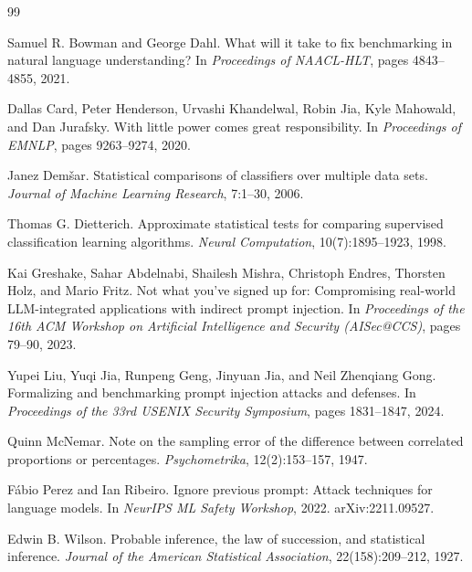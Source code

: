 \documentclass[11pt]{article}
\begin{document}
\begin{thebibliography}{99}

Samuel R. Bowman and George Dahl.
\newblock What will it take to fix benchmarking in natural language understanding?
\newblock In \emph{Proceedings of NAACL-HLT}, pages 4843--4855, 2021.

Dallas Card, Peter Henderson, Urvashi Khandelwal, Robin Jia, Kyle Mahowald, and
Dan Jurafsky.
\newblock With little power comes great responsibility.
\newblock In \emph{Proceedings of EMNLP}, pages 9263--9274, 2020.

Janez Dem\v{s}ar.
\newblock Statistical comparisons of classifiers over multiple data sets.
\newblock \emph{Journal of Machine Learning Research}, 7:1--30, 2006.

Thomas G. Dietterich.
\newblock Approximate statistical tests for comparing supervised classification
learning algorithms.
\newblock \emph{Neural Computation}, 10(7):1895--1923, 1998.

Kai Greshake, Sahar Abdelnabi, Shailesh Mishra, Christoph Endres, Thorsten Holz,
and Mario Fritz.
\newblock Not what you've signed up for: Compromising real-world
LLM-integrated applications with indirect prompt injection.
\newblock In \emph{Proceedings of the 16th ACM Workshop on Artificial
Intelligence and Security (AISec@CCS)}, pages 79--90, 2023.

Yupei Liu, Yuqi Jia, Runpeng Geng, Jinyuan Jia, and Neil Zhenqiang Gong.
\newblock Formalizing and benchmarking prompt injection attacks and defenses.
\newblock In \emph{Proceedings of the 33rd USENIX Security Symposium},
pages 1831--1847, 2024.

Quinn McNemar.
\newblock Note on the sampling error of the difference between correlated
proportions or percentages.
\newblock \emph{Psychometrika}, 12(2):153--157, 1947.

F\'{a}bio Perez and Ian Ribeiro.
\newblock Ignore previous prompt: Attack techniques for language models.
\newblock In \emph{NeurIPS ML Safety Workshop}, 2022.
\newblock arXiv:2211.09527.

Edwin B. Wilson.
\newblock Probable inference, the law of succession, and statistical inference.
\newblock \emph{Journal of the American Statistical Association},
22(158):209--212, 1927.

\end{thebibliography}
\end{document}
